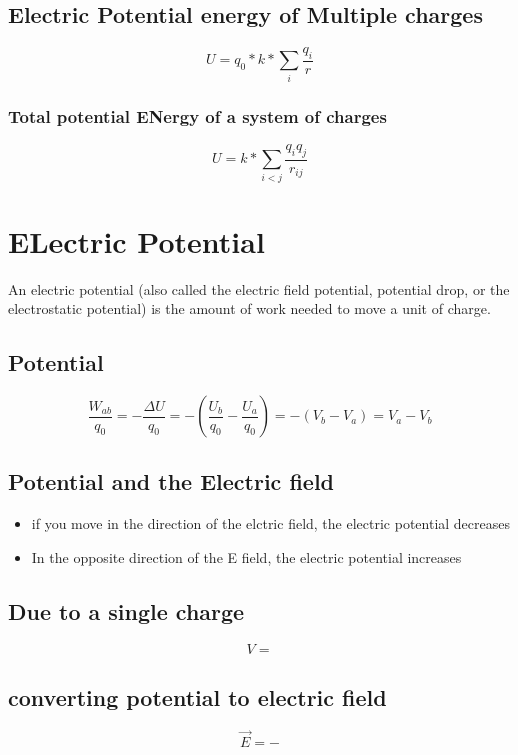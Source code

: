 \documentclass[a4paper,12pt]{article}
\begin{document}
        \subsection*{Electric Potential energy of Multiple charges}
            \[U=q_0*k*\sum_{i}^{}\frac{q_i}{r}\]
            \subsubsection*{Total potential ENergy of a system of charges}
                \[U=k*\sum_{i<j}^{}\frac{q_iq_j}{r_{ij}}\]
        
        \section{ELectric Potential}    
        An electric potential (also called the electric field potential, potential drop, or the electrostatic potential) is the amount of work needed to move a unit of charge.
            \subsection*{Potential}
                \[\frac{W_{ab}}{q_0}=-\frac{\Delta U}{q_0}=-(\frac{U_b}{q_0}-\frac{U_a}{q_0})=-(V_b-V_a)=V_a-V_b\]
            \subsection*{Potential and the Electric field}
            \begin{itemize}
                \item if you move in the direction of the elctric field, the electric potential decreases
                \item In the opposite direction of the E field, the electric potential increases 
            \end{itemize}
            \subsection*{Due to a single charge}    
                \[V=\]
            \subsection*{converting potential to electric field}
                \[\vec{E}=-\]
                
\end{document}
